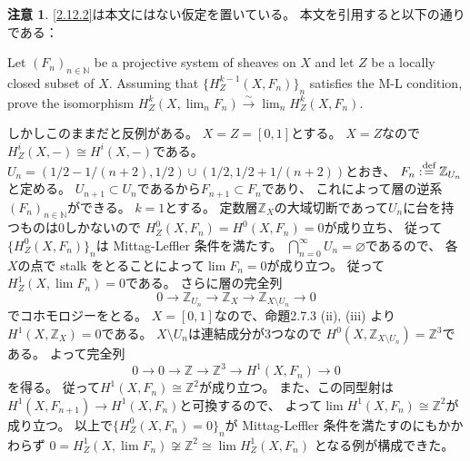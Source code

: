 \documentclass[uplatex,dvipdfmx]{jsarticle}
\theoremstyle{definition}
\newtheorem*{rem*}{注意}
\newcommand\Z{\mathbb{Z}}
\newcommand\N{\mathbb{N}}
\renewcommand{\emptyset}{\varnothing}
\def\dfn{:\overset{\mbox{{\scriptsize def}}}{=}}
\begin{document}
\begin{rem*}
  \ref{2.12.2}は本文にはない仮定を置いている。
  本文を引用すると以下の通りである：

  Let \((F_n)_{n\in \N}\) be a projective system of sheaves on \(X\) and
  let \(Z\) be a locally closed subset of \(X\).
  Assuming that \(\{H^{k-1}_Z(X,F_n)\}_n\) satisfies the M-L condition,
  prove the isomorphism
  \(H^k_Z(X,\lim_n F_n) \xrightarrow{\sim} \lim_n H^k_Z(X,F_n)\).

  しかしこのままだと反例がある。
  \(X=Z=[0,1]\)とする。
  \(X=Z\)なので\(H^i_Z(X,-)\cong H^i(X,-)\)である。
  \(U_n=(1/2-1/(n+2),1/2)\cup (1/2,1/2+1/(n+2))\)とおき、
  \(F_n\dfn \Z_{U_n}\)と定める。
  \(U_{n+1}\subset U_n\)であるから\(F_{n+1}\subset F_n\)であり、
  これによって層の逆系\((F_n)_{n\in \N}\)ができる。
  \(k=1\)とする。
  定数層\(\Z_X\)の大域切断であって\(U_n\)に台を持つものは\(0\)しかないので
  \(H^0_Z(X,F_n)=H^0(X,F_n)=0\)が成り立ち、
  従って\(\{H^0_Z(X,F_n)\}_n\)は Mittag-Leffler 条件を満たす。
  \(\bigcap_{n=0}^{\infty}U_n=\emptyset\)であるので、
  各\(X\)の点で stalk をとることによって\(\lim F_n=0\)が成り立つ。
  従って\(H^1_Z(X,\lim F_n)=0\)である。
  さらに層の完全列
  \[0\to \Z_{U_n}\to \Z_X\to \Z_{X\setminus U_n}\to 0\]
  でコホモロジーをとる。
  \(X=[0,1]\)なので、命題2.7.3 (ii), (iii) より\(H^1(X,\Z_X)=0\)である。
  \(X\setminus U_n\)は連結成分が3つなので
  \(H^0(X,\Z_{X\setminus U_n})=\Z^3\)である。
  よって完全列
  \[
  0\to 0\to \Z \to \Z^3 \to H^1(X,F_n) \to 0
  \]
  を得る。
  従って\(H^1(X,F_n)\cong \Z^2\)が成り立つ。
  また、この同型射は\(H^1(X,F_{n+1})\to H^1(X,F_n)\)と可換するので、
  よって\(\lim H^1(X,F_n)\cong \Z^2\)が成り立つ。
  以上で\(\{H^0_Z(X,F_n)=0\}_n\)が Mittag-Leffler 条件を満たすのにもかかわらず
  \(0=H^1_Z(X,\lim F_n) \not\cong \Z^2\cong \lim H^1_Z(X,F_n)\)
  となる例が構成できた。
\end{rem*}
\end{document}
